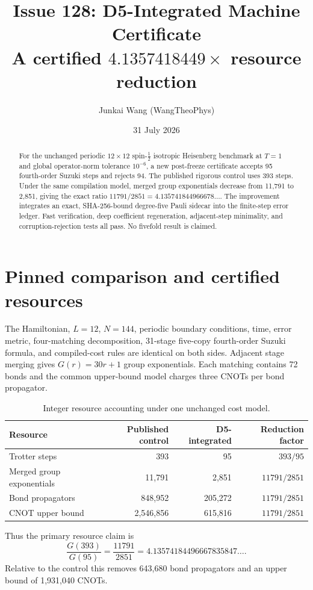 \documentclass[10pt]{article}
\title{\textbf{Issue 128: D5-Integrated Machine Certificate}\\
\large A certified $4.1357418449\times$ resource reduction}
\author{Junkai Wang (WangTheoPhys)}
\date{31 July 2026}
\begin{document}
\maketitle

\begin{abstract}
For the unchanged periodic $12\times12$ spin-$\tfrac12$ isotropic Heisenberg
benchmark at $T=1$ and global operator-norm tolerance $10^{-6}$, a new
post-freeze certificate accepts 95 fourth-order Suzuki steps and rejects 94.
The published rigorous control uses 393 steps.  Under the same compilation
model, merged group exponentials decrease from 11,791 to 2,851, giving the
exact ratio $11791/2851=4.135741844966678\ldots$.  The improvement integrates
an exact, SHA-256-bound degree-five Pauli sidecar into the finite-step error
ledger.  Fast verification, deep coefficient regeneration, adjacent-step
minimality, and corruption-rejection tests all pass.  No fivefold result is
claimed.
\end{abstract}

\section{Pinned comparison and certified resources}

The Hamiltonian, $L=12$, $N=144$, periodic boundary conditions, time, error
metric, four-matching decomposition, 31-stage five-copy fourth-order Suzuki
formula, and compiled-cost rules are identical on both sides.  Adjacent stage
merging gives $G(r)=30r+1$ group exponentials.  Each matching contains 72
bonds and the common upper-bound model charges three CNOTs per bond
propagator.

\begin{table}[h]
\centering
\begin{tabular}{@{}lrrr@{}}
\toprule
Resource & Published control & D5-integrated & Reduction factor \\
\midrule
Trotter steps & 393 & 95 & $393/95$ \\
Merged group exponentials & 11,791 & 2,851 & $11791/2851$ \\
Bond propagators & 848,952 & 205,272 & $11791/2851$ \\
CNOT upper bound & 2,546,856 & 615,816 & $11791/2851$ \\
\bottomrule
\end{tabular}
\caption{Integer resource accounting under one unchanged cost model.}
\end{table}

Thus the primary resource claim is
\[
 \frac{G(393)}{G(95)}=\frac{11791}{2851}
 =4.13574184496667835847\ldots .
\]
Relative to the control this removes 643,680 bond propagators and an upper
bound of 1,931,040 CNOTs.
\end{document}

